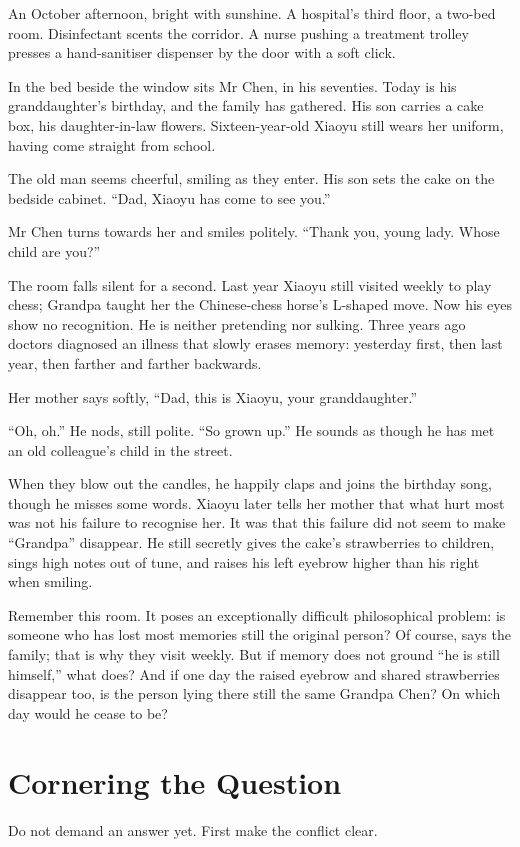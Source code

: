 An October afternoon, bright with sunshine. A hospital's third floor, a two-bed room. Disinfectant scents the corridor. A nurse pushing a treatment trolley presses a hand-sanitiser dispenser by the door with a soft click.

In the bed beside the window sits Mr Chen, in his seventies. Today is his granddaughter's birthday, and the family has gathered. His son carries a cake box, his daughter-in-law flowers. Sixteen-year-old Xiaoyu still wears her uniform, having come straight from school.

The old man seems cheerful, smiling as they enter. His son sets the cake on the bedside cabinet. ``Dad, Xiaoyu has come to see you.''

Mr Chen turns towards her and smiles politely. ``Thank you, young lady. Whose child are you?''

The room falls silent for a second. Last year Xiaoyu still visited weekly to play chess; Grandpa taught her the Chinese-chess horse's L-shaped move. Now his eyes show no recognition. He is neither pretending nor sulking. Three years ago doctors diagnosed an illness that slowly erases memory: yesterday first, then last year, then farther and farther backwards.

Her mother says softly, ``Dad, this is Xiaoyu, your granddaughter.''

``Oh, oh.'' He nods, still polite. ``So grown up.'' He sounds as though he has met an old colleague's child in the street.

When they blow out the candles, he happily claps and joins the birthday song, though he misses some words. Xiaoyu later tells her mother that what hurt most was not his failure to recognise her. It was that this failure did not seem to make ``Grandpa'' disappear. He still secretly gives the cake's strawberries to children, sings high notes out of tune, and raises his left eyebrow higher than his right when smiling.

Remember this room. It poses an exceptionally difficult philosophical problem: is someone who has lost most memories still the original person? Of course, says the family; that is why they visit weekly. But if memory does not ground ``he is still himself,'' what does? And if one day the raised eyebrow and shared strawberries disappear too, is the person lying there still the same Grandpa Chen? On which day would he cease to be?

\section{Cornering the Question}
Do not demand an answer yet. First make the conflict clear.

